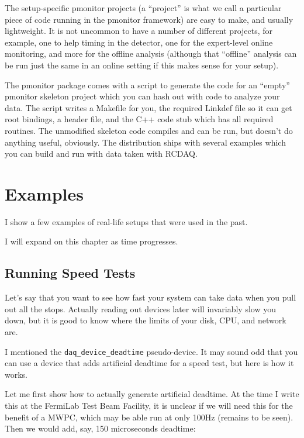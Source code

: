 \documentclass{article}[11pt]
\begin{document}
The setup-specific pmonitor projects (a ``project'' is what we call a
particular piece of code running in the pmonitor framework) are easy
to make, and usually lightweight. It is not uncommon to have a number
of different projects, for example, one to help timing in the
detector, one for the expert-level online monitoring, and more for the
offline analysis (although that ``offline'' analysis can be run just
the same in an online setting if this makes sense for your setup).

The pmonitor package comes with a script to generate the code for an
``empty'' pmonitor skeleton project which you can hash out with code
to analyze your data. The script writes a Makefile for you, the
required Linkdef file so it can get root bindings, a header file, and
the C++ code stub which has all required routines. The unmodified skeleton
code compiles and can be run, but doesn't do anything useful,
obviously. The distribution ships with several examples which you can
build and run with data taken with RCDAQ.



\appendix

\section{Examples}

I show a few examples of real-life setups that were used in the past.

I will expand on this chapter as time progresses.

\subsection{Running Speed Tests}
\label{speedtests}
Let's say that you want to see how fast your system can take data when
you pull out all the stops. Actually reading out devices later will
invariably slow you down, but it is good to know where the limits of
your disk, CPU, and network are.

I mentioned the \verb|daq_device_deadtime| pseudo-device. It may sound
odd that you can use a device that adds artificial deadtime for a
speed test, but here is how it works.

Let me first show how to actually generate artificial deadtime. At the
time I write this at the FermiLab Test Beam Facility, it is unclear if
we will need this for the benefit of a MWPC, which may be able run at
only 100Hz (remains to be seen). Then we would add, say, 150 microseconds
deadtime:
\end{document}
